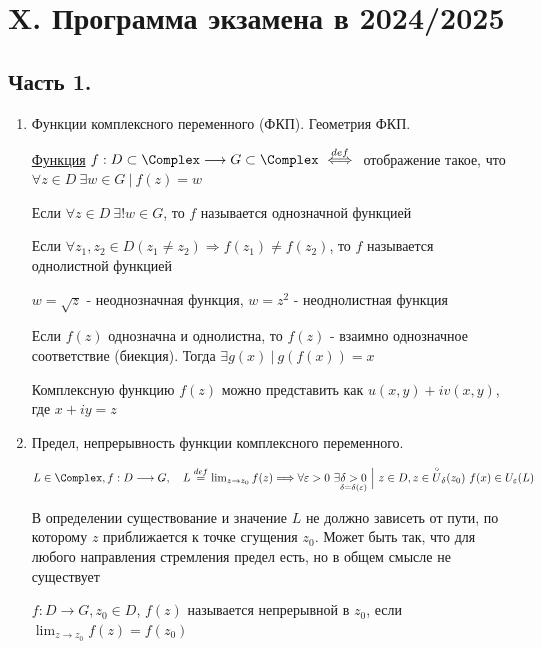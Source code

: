 \documentclass[12pt]{article}
\begin{document}
\clearpage

\section{X. Программа экзамена в 2024/2025}

\subsection{Часть 1.}

\begin{enumerate}
    \item Функции комплексного переменного (ФКП). Геометрия ФКП.

    \Defs \hyperlink{complex_function}{Функция} $f : D \subset \Complex \longrightarrow G \subset \Complex \ \overset{def}{\Longleftrightarrow} \ $ отображение такое, 
    что $\forall z \in D \ \exists w \in G \ | \ f(z) = w$

    \Defs Если $\forall z \in D \ \exists! w \in G$, то $f$ называется однозначной функцией

    \Defs Если $\forall z_1, z_2 \in D (z_1 \neq z_2) \Longrightarrow f(z_1) \neq f(z_2)$, 
    то $f$ называется однолистной функцией
    
    \Exs $w = \sqrt{z}$ - неоднозначная функция, $w = z^2$ - неоднолистная функция

    \Notas Если $f(z)$ однозначна и однолистна, то $f(z)$ - взаимно однозначное соответствие (биекция). Тогда $\exists g(x) \ | \ g(f(x)) = x$
    
    Комплексную функцию $f(z)$ можно представить как $u(x, y) + i v(x, y)$, где $x + iy = z$

    \item Предел, непрерывность функции комплексного переменного.

     $L \in \Complex, f : D \longrightarrow G, \quad L \overset{def}{=} \lim_{z \to z_0} f(z) \Longrightarrow
    \forall \varepsilon > 0 \ \exists \underset{\delta = \delta(\varepsilon)}{\delta > 0} \ \Big| \ z \in D, z \in \overset{\circ}{U}_\delta(z_0) \ f(x) \in U_\varepsilon(L)$

    В определении существование и значение $L$ не должно зависеть от пути, по которому $z$ приближается к точке сгущения $z_0$.
    Может быть так, что для любого направления стремления предел есть, но в общем смысле не существует

     $f : D \longrightarrow G, z_0 \in D$, $f(z)$ называется непрерывной в $z_0$, если $\lim_{z \to z_0} f(z) = f(z_0)$


\end{enumerate}
\end{document}
